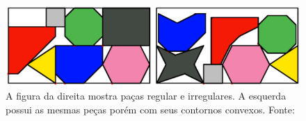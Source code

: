 \begin{figure}[!htb]
    \centering
    \includegraphics[scale=0.7]{utils/images/pieces-example}
    \caption{A figura da direita mostra paças regular e irregulares. A esquerda possui as mesmas peças porém com seus contornos convexos. Fonte:\cite{aprendizado-reforco}}
    \label{fig:pieces-example}
\end{figure}
